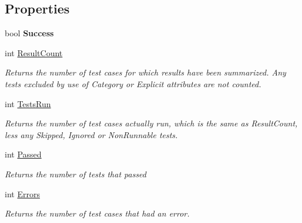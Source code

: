 \subsection*{Properties}
\begin{DoxyCompactItemize}
\item 
\mbox{\label{class_unity_test_1_1_result_summarizer_a4947409d1c021e72d16be1f2f416d52c}} 
bool {\bfseries Success}
\item 
int \hyperlink{class_unity_test_1_1_result_summarizer_a6b425bd332a8c61fa111bcc393eeffe3}{Result\+Count}
\begin{DoxyCompactList}\small\item\em Returns the number of test cases for which results have been summarized. Any tests excluded by use of Category or Explicit attributes are not counted. \end{DoxyCompactList}\item 
int \hyperlink{class_unity_test_1_1_result_summarizer_a3bd8726e51300403ced1456d12ddad19}{Tests\+Run}
\begin{DoxyCompactList}\small\item\em Returns the number of test cases actually run, which is the same as Result\+Count, less any Skipped, Ignored or Non\+Runnable tests. \end{DoxyCompactList}\item 
int \hyperlink{class_unity_test_1_1_result_summarizer_ab45133d40f94fc4ea8af38dbe9b8753f}{Passed}
\begin{DoxyCompactList}\small\item\em Returns the number of tests that passed \end{DoxyCompactList}\item 
int \hyperlink{class_unity_test_1_1_result_summarizer_a50a3a7b171d773c3aaa2902add53e1a5}{Errors}
\begin{DoxyCompactList}\small\item\em Returns the number of test cases that had an error. \end{DoxyCompactList}\item 

\end{DoxyCompactItemize}
